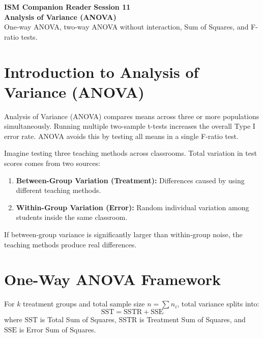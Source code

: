 \documentclass[10pt,a4paper]{article}
\begin{document}
\begin{tcolorbox}[enhanced, colback=brandink, colframe=brandink, arc=0pt, left=12pt, right=12pt, top=12pt, bottom=12pt]
  \color{white}
  \large\textbf{ISM Companion Reader} \hfill \textbf{Session 11}\\[4pt]
  \huge\textbf{Analysis of Variance (ANOVA)}\\[4pt]
  \small One-way ANOVA, two-way ANOVA without interaction, Sum of Squares, and F-ratio tests.
\end{tcolorbox}

\vspace{10pt}

\section{Introduction to Analysis of Variance (ANOVA)}

Analysis of Variance (ANOVA) compares means across three or more populations simultaneously. Running multiple two-sample t-tests increases the overall Type I error rate. ANOVA avoids this by testing all means in a single F-ratio test.

\begin{intuition}
Imagine testing three teaching methods across classrooms. Total variation in test scores comes from two sources:
\begin{enumerate}
  \item \textbf{Between-Group Variation (Treatment):} Differences caused by using different teaching methods.
  \item \textbf{Within-Group Variation (Error):} Random individual variation among students inside the same classroom.
\end{enumerate}
If between-group variance is significantly larger than within-group noise, the teaching methods produce real differences.
\end{intuition}

\section{One-Way ANOVA Framework}

For $k$ treatment groups and total sample size $n = \sum n_i$, total variance splits into:
\[
\text{SST} = \text{SSTR} + \text{SSE}
\]
where $\text{SST}$ is Total Sum of Squares, $\text{SSTR}$ is Treatment Sum of Squares, and $\text{SSE}$ is Error Sum of Squares.
\end{document}
